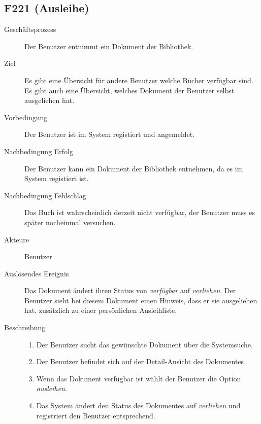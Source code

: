 \subsection{F221 (Ausleihe)}
\begin{description}
  \item[Geschäftsprozess]Der Benutzer entnimmt ein Dokument der Bibliothek.
  \item[Ziel]Es gibt eine Übersicht für andere Benutzer welche Bücher verfügbar sind. Es gibt auch eine Übersicht, welches Dokument der Benutzer selbst ausgeliehen hat.
  \item[Vorbedingung]Der Benutzer ist im System registiert und angemeldet.
  \item[Nachbedingung Erfolg]Der Benutzer kann ein Dokument der Bibliothek entnehmen, da es im System registiert ist.
  \item[Nachbedingung Fehlschlag]Das Buch ist wahrscheinlich derzeit nicht verfügbar, der Benutzer muss es später nocheinmal versuchen.
  \item[Akteure]Benutzer
  \item[Auslösendes Ereignis]Das Dokument ändert ihren Status von \emph{verfügbar} auf \emph{verliehen}. Der Benutzer sieht bei diesem Dokument einen Hinweis, dass er sie ausgeliehen hat, zusätzlich zu einer persönlichen Ausleihliste.
  \item[Beschreibung]\hfill
    \begin{enumerate}
      \item Der Benutzer sucht das gewünschte Dokument über die Systemsuche.
      \item Der Benutzer befindet sich auf der Detail-Ansicht des Dokumentes.
      \item Wenn das Dokument verfügbar ist wählt der Benutzer die Option \emph{ausleihen}.
      \item Das System ändert den Status des Dokumentes auf \emph{verliehen} und registriert den Benutzer entsprechend.
    \end{enumerate}
\end{description}

